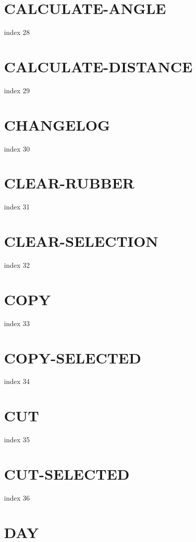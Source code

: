 \documentclass[10pt]{report}
\begin{document}
\section{CALCULATE-ANGLE}

index 28

\section{CALCULATE-DISTANCE}

index 29

\section{CHANGELOG}

index 30

\section{CLEAR-RUBBER}

index 31

\section{CLEAR-SELECTION}

index 32

\section{COPY}

index 33

\section{COPY-SELECTED}

index 34

\section{CUT}

index 35

\section{CUT-SELECTED}

index 36

\section{DAY}
\end{document}

